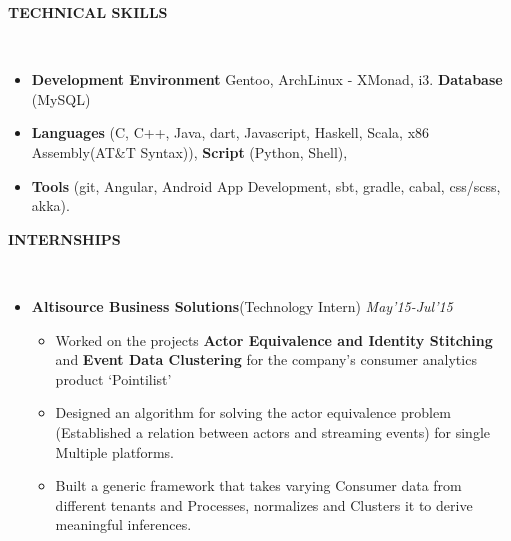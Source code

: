 \documentclass[a4paper,10pt]{article}
\newcommand{\lsep}{-0.5cm}
\newcommand{\resheading}[1]{{\small \colorbox{mygrey}{\begin{minipage}{0.975\textwidth}{\textbf{#1 \vphantom{p\^{E}}}}\end{minipage}}}}
\begin{document}
        \resheading{\textbf{TECHNICAL SKILLS} }\\[\lsep]
        \vspace{1mm}
        \begin{itemize} \itemsep -3pt
        \item \noindent \textbf{Development Environment} Gentoo, ArchLinux - XMonad, i3.    \textbf{Database} (MySQL)
        \item \noindent \textbf{Languages} (C, C++, Java, dart, Javascript, Haskell, Scala, x86 Assembly(AT\&T Syntax)), \textbf{Script} (Python, Shell), 
        \item\textbf{Tools} (git, Angular, Android App Development, sbt, gradle, cabal, css/scss, akka).
        \end{itemize}

        \resheading{\textbf{INTERNSHIPS} }\\[\lsep]
        \vspace{1mm}\begin{itemize}
        \item \textbf{  Altisource Business Solutions}(Technology Intern) \hfill  \textit{May'15-Jul'15}
          \vspace{-2mm}\begin{itemize} \itemsep -2pt
          \item Worked on the projects \textbf{Actor Equivalence and Identity Stitching} and \textbf{Event Data Clustering} for the company's consumer analytics product `Pointilist'
          \item Designed an algorithm for solving the actor equivalence problem (Established a relation between actors and streaming events) for single Multiple platforms.
          \item Built a generic framework that takes varying Consumer data from different tenants and Processes, normalizes and Clusters it to derive meaningful inferences.
          \end{itemize}
        \end{itemize}
\end{document}
